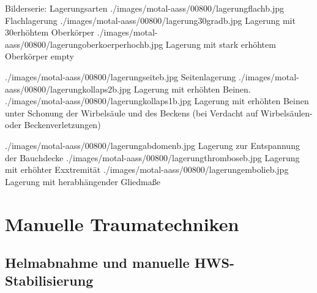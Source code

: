 \begin{PictureSeriesWide}{}{Bilderserie: Lagerungsarten}
{./images/motal-aass/00800/lagerungflachb.jpg}
{Flachlagerung}
{./images/motal-aass/00800/lagerung30gradb.jpg}
{Lagerung mit 30\Deg erhöhtem Oberkörper}
{./images/motal-aass/00800/lagerungoberkoerperhochb.jpg}
{Lagerung mit stark erhöhtem Oberkörper }
{empty}
{}

{./images/motal-aass/00800/lagerungseiteb.jpg}
{Seitenlagerung}
{./images/motal-aass/00800/lagerungkollaps2b.jpg}
{Lagerung mit erhöhten Beinen.}
{./images/motal-aass/00800/lagerungkollaps1b.jpg}
{Lagerung mit
erhöhten Beinen unter Schonung der Wirbelsäule und des
Beckens (bei Verdacht auf Wirbelsäulen- oder
Beckenverletzungen)}
{}
{}

{./images/motal-aass/00800/lagerungabdomenb.jpg}
{Lagerung zur Entspannung der Bauchdecke}
{./images/motal-aass/00800/lagerungthromboseb.jpg}
{Lagerung mit erhöhter Exxtremität}
{./images/motal-aass/00800/lagerungembolieb.jpg}
{Lagerung mit herabhängender Gliedmaße}
{}
{}
\end{PictureSeriesWide}



\clearpage




\needspace{0.5\textheight}
\section{Manuelle Traumatechniken}


\subsection{Helmabnahme und manuelle HWS-Stabilisierung}
\label{topic:helmabnahme}
\label{topic:hws-stabilisierung-manuell}


